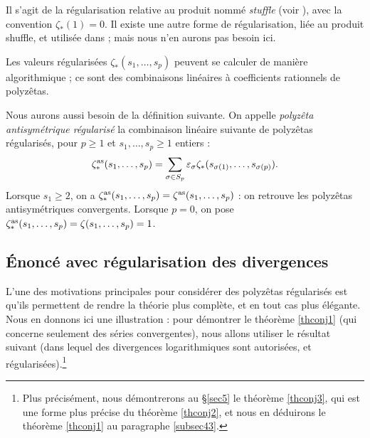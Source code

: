 \documentclass[12pt,francais, reqno]{smfart}
\numberwithin{equation}{section}
\newcommand{\eps}{\varepsilon}
\newcommand{\zetaetoile}{\zeta _*}
\newcommand{\zetaetoileantisym}{\zeta _* ^{{\rm as}}}
\newcommand{\zetaantisym}{\zeta^{{\rm as}}}
\begin{document}
Il s'agit de la r\'egularisation relative au produit nomm\'e {\em stuffle} (voir \cite{MiW}), avec la convention $\zetaetoile (1) = 0$. Il existe une autre forme de r\'egularisation, li\'ee au produit shuffle, et utilis\'ee dans \cite{CFRalgo} ; mais nous n'en aurons pas besoin ici. 

\bigskip

Les valeurs r\'egularis\'ees $\zetaetoile (s_1,\ldots, s_p)$  peuvent se calculer de mani\`ere algorithmique ; ce sont des combinaisons lin\'eaires \`a coefficients rationnels de polyz\^etas. 

\bigskip

Nous aurons aussi besoin de la d\'efinition suivante. On appelle {\em polyz\^eta antisym\'etrique r\'egularis\'e} la combinaison  lin\'eaire suivante de polyz\^etas  r\'egularis\'es, pour  $p \geq 1$ et $s_1, \ldots, s_p \geq 1$ entiers :
$$\zetaetoileantisym (s_1, \ldots, s_p) =  \sum_{\sigma\in\mathfrak{S}_p} \eps_{\sigma} \zetaetoile(s_{\sigma(1)}, \ldots, s_{\sigma(p)}) .$$
Lorsque $s_1 \geq 2$, on a $\zetaetoileantisym (s_1, \ldots, s_p) = \zetaantisym (s_1, \ldots, s_p) $ : on retrouve les polyz\^etas antisym\'etriques convergents.  Lorsque $p=0$, on pose $\zetaetoileantisym (s_1, \ldots, s_p) = \zeta  (s_1, \ldots, s_p) = 1$. 



\subsection{\'Enonc\'e avec r\'egularisation des divergences} \label{subsec32}

L'une des motivations principales pour consid\'erer des polyz\^etas r\'egularis\'es est qu'ils permettent de rendre la th\'eorie  plus compl\`ete, et en tout cas plus \'el\'egante. Nous en donnons ici une illustration : pour d\'emontrer le   th\'eor\`eme \ref{thconj1} (qui concerne seulement des s\'eries convergentes), nous allons utiliser le r\'esultat suivant (dans lequel des divergences logarithmiques sont autoris\'ees, et r\'egularis\'ees).\footnote{Plus pr\'ecis\'ement, nous d\'emontrerons au \S \ref{sec5} le th\'eor\`eme \ref{thconj3}, qui est une forme plus pr\'ecise  du  th\'eor\`eme \ref{thconj2}, et  nous en d\'eduirons le  th\'eor\`eme \ref{thconj1}   au paragraphe \ref{subsec43}.}
\end{document}
